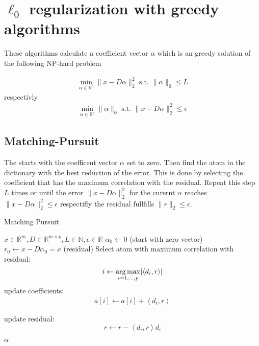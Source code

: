 \section{$\ell_0$ regularization with greedy algorithms}
These algorithms calculate a coefficient vector $\alpha$ which is an
greedy solution of the following NP-hard problem

\begin{align}
\min_{\alpha\in\mathbb{R}^{p}}  \lVert x - D\alpha \rVert^{2}_{2} \textrm{ s.t. } \lVert \alpha \rVert_{0} \leq L
\end{align}
respectivly
\begin{align}
\min_{\alpha\in\mathbb{R}^{p}}   \lVert \alpha \rVert_{0}   \textrm{ s.t. } \lVert x - D\alpha \rVert^{2}_{2} \leq \epsilon
\end{align}
\cite{Mallat1993}

\subsection{Matching-Pursuit}
\label{sec:mp}

The  starts with the coefficent vector $\alpha$ set to
zero. Then find the atom in the dictionary with the best reduction of the
error. This is done by selecting the coefficient that has the maximum
correlation with the residual. Repeat this step $L$ times or until the error
$\lVert x - D\alpha \rVert^{2}_{2}$ for the curernt $\alpha$ reaches $\lVert x -
D\alpha \rVert^{2}_{2} \leq \epsilon$ respectifly the residual fullfills $\lVert
r \rVert_2 \leq \epsilon$.


\begin{algorithm}
\caption{Matching Pursuit}
\label{alg:mp}
\begin{algorithmic}[1]
\REQUIRE $x \in \mathbb{R}^m, D \in \mathbb{R}^{m\times p}, L \in \mathbb{N}, \epsilon \in \mathbb{R}$
\STATE $\alpha_0 \gets 0$ (start with zero vector)
\STATE $r_0 \gets x-D\alpha_0 = x$ (residual) 
\STATE Select atom with maximum correlation with residual: 
\begin{equation*}
i \gets \operatorname*{arg\,max}_{i=1,...,p} \lvert \left<d_i,r\right> \rvert
\end{equation*}
\STATE update coefficients: 
\begin{align}
a[i]  \gets a[i] + \left<d_i,r\right> \label{eq:mp_update}
\end{align}

\STATE update residual:
\begin{equation*}
 r \gets r - \left<d_i,r\right>d_i
\end{equation*}

\ENDWHILE
\RETURN $\alpha$
\end{algorithmic}
\end{algorithm}
